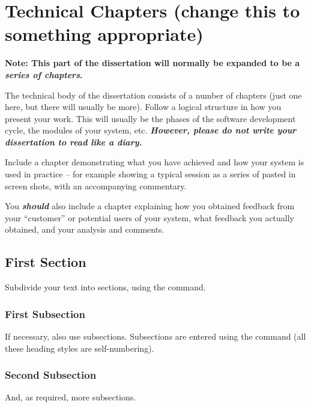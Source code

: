 \chapter{Technical Chapters (change this to something appropriate)}
\textbf{Note: This part of the dissertation will normally be expanded to be a 
\textit{series of chapters}.}

The technical body of the dissertation consists of a number of chapters (just 
one here, but there will usually be more).  Follow a logical structure in how 
you present your work.  This will usually be the phases of the software 
development cycle, the modules of your system, etc. \textbf{\textit{However, 
please do not write your dissertation to read like a diary.}}

Include a chapter demonstrating what you have achieved and how your system is 
used in practice -- for example showing a typical session as a series of pasted 
in screen shots, with an accompanying commentary.

You \textbf{\textit{should}} also include a chapter explaining how you obtained 
feedback from your ``customer'' or potential users of your system, what 
feedback you actually obtained, and your analysis and comments.

\section{First Section}
Subdivide your text into sections, using the  command.

\subsection{First Subsection}
If necessary, also use subsections. Subsections are entered using the 
 command (all these heading styles are self-numbering).


\subsection{Second Subsection}
And, as required, more subsections.

